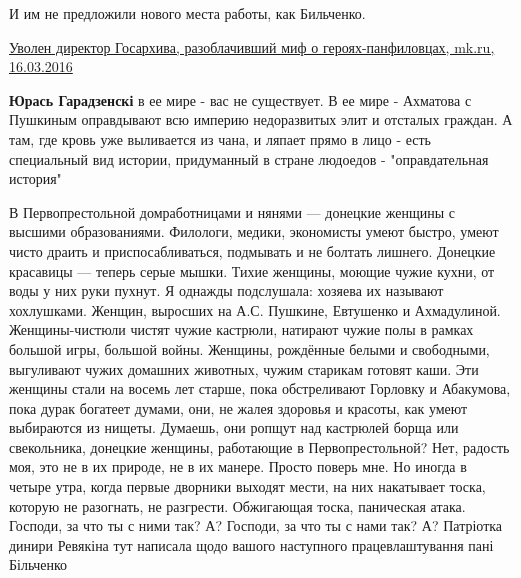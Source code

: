 \begin{itemize}
И им не предложили нового места работы, как Бильченко.

\href{https://www.mk.ru/social/2016/03/16/uvolen-direktor-gosarkhiva-razoblachivshiy-mif-o-geroyakhpanfilovcakh.html}{%
Уволен директор Госархива, разоблачивший миф о героях-панфиловцах, mk.ru, 16.03.2016%
}

\begin{itemize}
 
\textbf{Юрась Гарадзенскі} в ее мире - вас не существует. В ее мире - Ахматова с Пушкиным оправдывают всю империю недоразвитых элит и отсталых граждан. А там, где кровь уже выливается из чана, и ляпает прямо в лицо - есть специальный вид истории, придуманный в стране людоедов - "оправдательная история"
\end{itemize}

 

\obeycr
В Первопрестольной домработницами и нянями —
донецкие женщины с высшими образованиями.
Филологи, медики, экономисты
умеют быстро, умеют чисто
драить и приспосабливаться,
подмывать и не болтать лишнего.
Донецкие красавицы —
теперь серые мышки.
Тихие женщины, моющие чужие кухни,
от воды у них руки пухнут.
Я однажды подслушала:
хозяева их называют хохлушками.
Женщин, выросших на А.С. Пушкине,
Евтушенко и Ахмадулиной.
Женщины-чистюли
чистят чужие кастрюли,
натирают чужие полы
в рамках большой игры,
большой войны.
Женщины, рождённые белыми и свободными,
выгуливают чужих домашних животных,
чужим старикам готовят каши.
Эти женщины стали на восемь лет старше,
пока обстреливают Горловку и Абакумова,
пока дурак богатеет думами,
они, не жалея здоровья и красоты,
как умеют выбираются из нищеты.
Думаешь, они ропщут над кастрюлей борща или свекольника,
донецкие женщины, работающие в Первопрестольной?
Нет, радость моя, это не в их природе, не в их манере.
Просто поверь мне.
Но иногда в четыре утра, когда первые дворники выходят мести,
на них накатывает тоска, которую не разогнать, не разгрести.
Обжигающая тоска, паническая атака.
Господи, за что ты с ними так? А?
Господи, за что ты с нами так? А?
Патріотка динири Ревякіна тут написала щодо вашого наступного працевлаштування пані Більченко
\restorecr




\end{itemize}
